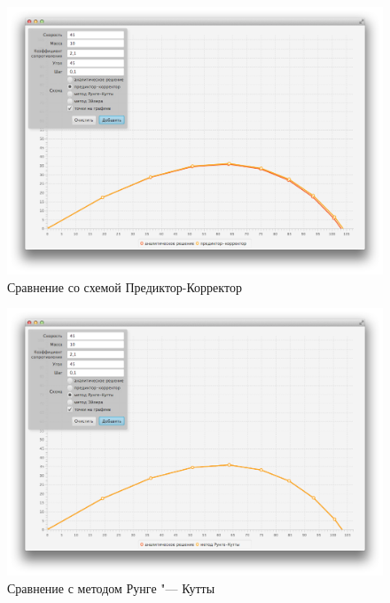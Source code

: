 \documentclass[a4paper, titlepage]{article}
\begin{document}
\begin{figure}[H]
\caption{Сравнение со схемой Предиктор-Корректор}
\includegraphics[width=\textwidth]{p-corrector}
\end{figure}


\begin{figure}[H]
\caption{Сравнение с методом Рунге "--- Кутты}
\includegraphics[width=\textwidth]{r-kutta}
\end{figure}
\end{document}
